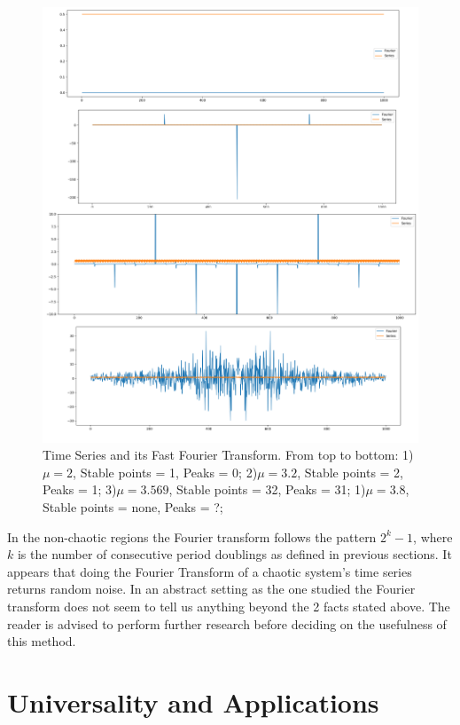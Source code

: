 \begin{figure}[h]
    \centering
    \includegraphics[width=1\textwidth]{Images/4ier5.png}
    \caption{Time Series and its Fast Fourier Transform. From top to bottom: 1)$\mu=2$, Stable points = 1, Peaks = 0;
    2)$\mu=3.2$, Stable points = 2, Peaks = 1;
    3)$\mu=3.569$, Stable points = 32, Peaks = 31;
    1)$\mu=3.8$, Stable points = none, Peaks = ?;
    }
    \label{fig:4ier1}
\end{figure}

In the non-chaotic regions the Fourier transform follows the pattern $2^k - 1$, where $k$ is the number of consecutive period doublings as 
defined in previous sections. It appears that doing the Fourier Transform of a chaotic system's time series returns random noise. In an abstract
setting as the one studied the Fourier transform does not seem to tell us anything beyond the 2 facts stated above. The reader is advised to 
perform further research before deciding on the usefulness of this method.

\section{Universality and Applications}

